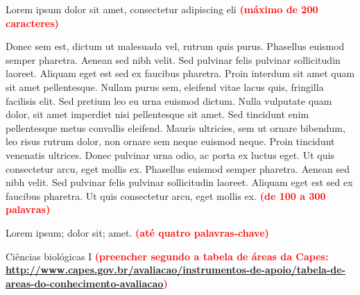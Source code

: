 \documentclass[a4paper,12pt]{article}
\begin{document}
\vspace*{0.85cm}\par
{}
\vspace*{0.35cm}\par
\noindent Lorem ipsum dolor sit amet, consectetur adipiscing eli
\textcolor{red}{\bf (máximo de 200 caracteres)}
\vspace*{0.35cm}\par
{}
\vspace*{0.35cm}\par
\noindent Donec sem est, dictum ut malesuada vel, rutrum quis purus. Phasellus euismod
semper pharetra. Aenean sed nibh velit. Sed pulvinar felis pulvinar
sollicitudin laoreet. Aliquam eget est sed ex faucibus pharetra. Proin interdum
sit amet quam sit amet pellentesque. Nullam purus sem, eleifend vitae lacus
quis, fringilla facilisis elit. Sed pretium leo eu urna euismod dictum. Nulla
vulputate quam dolor, sit amet imperdiet nisi pellentesque sit amet. Sed
tincidunt enim pellentesque metus convallis eleifend. Mauris ultricies, sem ut
ornare bibendum, leo risus rutrum dolor, non ornare sem neque euismod neque.
Proin tincidunt venenatis ultrices. Donec pulvinar urna odio, ac porta ex
luctus eget. Ut quis consectetur arcu, eget mollis ex. Phasellus euismod semper
pharetra. Aenean sed nibh velit. Sed pulvinar felis pulvinar sollicitudin
laoreet. Aliquam eget est sed ex faucibus pharetra. Ut quis consectetur arcu,
eget mollis ex.  \textcolor{red}{\bf (de 100 a 300 palavras)}

\vspace*{0.35cm}\par
{}
\vspace*{0.35cm}\par
\noindent Lorem ipsum; dolor sit; amet. \textcolor{red}{\bf(até quatro palavras-chave)}

\vspace*{0.35cm}\par
{}
\vspace*{0.35cm}\par
\noindent Ciências biológicas I \textcolor{red}{\bf (preencher segundo a tabela de áreas da Capes:
\url{http://www.capes.gov.br/avaliacao/instrumentos-de-apoio/tabela-de-areas-do-conhecimento-avaliacao})}
\end{document}
